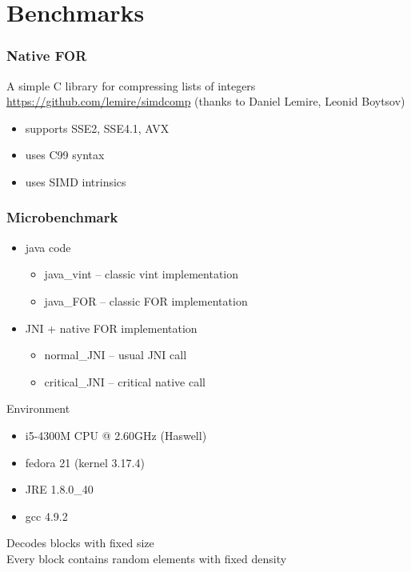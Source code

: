 \documentclass{beamer}
\begin{document}
	\section{Benchmarks}
	\begin{frame}
		\frametitle{Native FOR}
		A simple C library for compressing lists of integers \url{https://github.com/lemire/simdcomp} (thanks to  Daniel Lemire, Leonid Boytsov)
		\begin{itemize}
		\item supports SSE2, SSE4.1, AVX 
		\item uses C99 syntax
		\item uses SIMD intrinsics
		\end{itemize}
	\end{frame}
	\begin{frame}
		\frametitle{Microbenchmark}
		\begin{itemize}
		\item java code
		\begin{itemize}
		\item java\_vint -- classic vint implementation
		\item java\_FOR -- classic FOR implementation
		\end{itemize}
		\item JNI + native FOR implementation
		\begin{itemize}
		\item normal\_JNI -- usual JNI call
		\item critical\_JNI -- critical native call
		\end{itemize}
		\end{itemize}
		Environment
			\begin{itemize}
				\item i5-4300M CPU @ 2.60GHz (Haswell)
				\item fedora 21 (kernel 3.17.4)
				\item JRE 1.8.0\_40
				\item gcc 4.9.2 
			\end{itemize}
		\vskip15pt
		Decodes blocks with fixed size\\
		Every block contains random elements with fixed density
	\end{frame}
\end{document}
